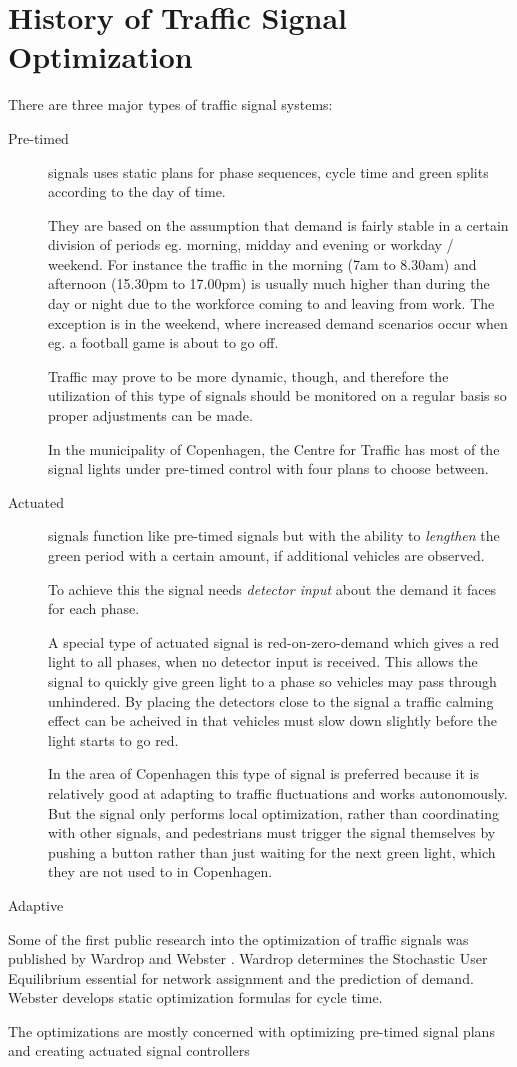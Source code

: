 \section{History of Traffic Signal Optimization}
\label{history}

There are three major types of traffic signal systems:

\begin{description}
\item[Pre-timed] signals uses static plans for phase sequences, cycle time and green splits according to the day of time. 

They are based on the assumption that demand is fairly stable in a certain division of periods eg. morning, midday and evening or workday / weekend. For instance the traffic in the morning (7am to 8.30am) and afternoon (15.30pm to 17.00pm) is usually much higher than during the day or night due to the workforce coming to and leaving from work. The exception is in the weekend, where increased demand scenarios occur when eg. a football game is about to go off.

Traffic may prove to be more dynamic, though, and therefore the utilization of this type of signals should be monitored on a regular basis so proper adjustments can be made.

In the municipality of Copenhagen, the Centre for Traffic has most of the signal lights under pre-timed control with four plans to choose between.
\item[Actuated] signals function like pre-timed signals but with the ability to \textit{lengthen} the green period with a certain amount, if additional vehicles are observed. 

To achieve this the signal needs \textit{detector input} about the demand it faces for each phase.

A special type of actuated signal is red-on-zero-demand which gives a red light to all phases, when no detector input is received. This allows the signal to quickly give green light to a phase  so vehicles may pass through unhindered. By placing the detectors close to the signal a traffic calming effect can be acheived in that vehicles must slow down slightly before the light starts to go red.

In the area of Copenhagen this type of signal is preferred because it is relatively good at adapting to traffic fluctuations and works autonomously. But the signal only performs local optimization, rather than coordinating with other signals, and pedestrians must trigger the signal themselves by pushing a button rather than just waiting for the next green light, which they are not used to in Copenhagen.
\item[Adaptive]
\end{description}

Some of the first public research into the optimization of traffic signals was published by Wardrop \cite{Wardrop} and Webster \cite{Webster}. Wardrop determines the Stochastic User Equilibrium essential for network assignment and the prediction of demand. Webster develops static optimization formulas for cycle time.

The optimizations are mostly concerned with optimizing pre-timed signal plans and creating actuated signal controllers